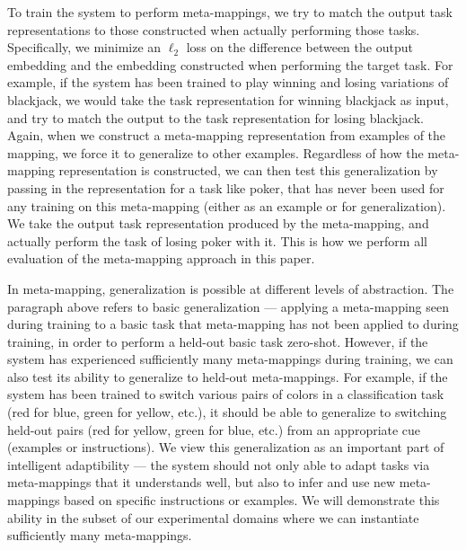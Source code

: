 To train the system to perform meta-mappings, we try to match the output task representations to those constructed when actually performing those tasks. Specifically, we minimize an \(\ell_2\) loss on the difference between the output embedding and the embedding constructed when performing the target task. For example, if the system has been trained to play winning and losing variations of blackjack, we would take the task representation for winning blackjack as input, and try to match the output to the task representation for losing blackjack. Again, when we construct a meta-mapping representation from examples of the mapping, we force it to generalize to other examples. Regardless of how the meta-mapping representation is constructed, we can then test this generalization by passing in the representation for a task like poker, that has never been used for any training on this meta-mapping (either as an example or for generalization). We take the output task representation produced by the meta-mapping, and actually perform the task of losing poker with it. This is how we perform all evaluation of the meta-mapping approach in this paper.

In meta-mapping, generalization is possible at different levels of abstraction. The paragraph above refers to basic generalization --- applying a meta-mapping seen during training to a basic task that meta-mapping has not been applied to during training, in order to perform a held-out basic task zero-shot. However, if the system has experienced sufficiently many meta-mappings during training, we can also test its ability to generalize to held-out meta-mappings. For example, if the system has been trained to switch various pairs of colors in a classification task (red for blue, green for yellow, etc.), it should be able to generalize to switching held-out pairs (red for yellow, green for blue, etc.) from an appropriate cue (examples or instructions). We view this generalization as an important part of intelligent adaptibility --- the system should not only able to adapt tasks via meta-mappings that it understands well, but also to infer and use new meta-mappings based on specific instructions or examples. We will demonstrate this ability in the subset of our experimental domains where we can instantiate sufficiently many meta-mappings. 

